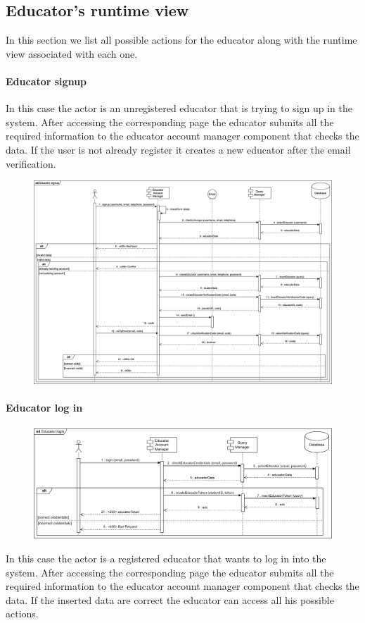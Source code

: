\documentclass[12pt, a4paper]{report}
\begin{document}
    \subsection{Educator's runtime view}
    In this section we list all possible actions for the educator along with the runtime view associated with each one. 
    \paragraph*{Educator signup}
    In this case the actor is an unregistered educator that is trying to sign up in the system.
    After accessing the corresponding page the educator submits all the required information to the educator account manager component that checks the data. 
    If the user is not already register it creates a new educator after the email verification. 
    \begin{figure}[H]
        \centering
        \includegraphics[width=1.0\linewidth]{images/esrv.png}
    \end{figure}

    \paragraph*{Educator log in}
    \begin{figure}[H]
        \centering
        \includegraphics[width=1.0\linewidth]{images/elirv.png}
    \end{figure}
    In this case the actor is a registered educator that wants to log in into the system. 
    After accessing the corresponding page the educator submits all the required information to the educator account manager component that checks the data. 
    If the inserted data are correct the educator can access all his possible actions. 
\end{document}
